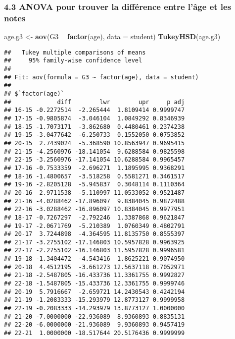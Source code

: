 \documentclass[
]{article}
\newenvironment{Shaded}{\begin{snugshade}}{\end{snugshade}}
\newcommand{\DataTypeTok}[1]{\textcolor[rgb]{0.13,0.29,0.53}{#1}}
\newcommand{\KeywordTok}[1]{\textcolor[rgb]{0.13,0.29,0.53}{\textbf{#1}}}
\newcommand{\NormalTok}[1]{#1}
\newcommand{\OperatorTok}[1]{\textcolor[rgb]{0.81,0.36,0.00}{\textbf{#1}}}
\newcommand{\StringTok}[1]{\textcolor[rgb]{0.31,0.60,0.02}{#1}}
\begin{document}
\hypertarget{anova-pour-trouver-la-diffuxe9rence-entre-luxe2ge-et-les-notes}{%
\subsubsection{4.3 ANOVA pour trouver la différence entre l'âge et les
notes}\label{anova-pour-trouver-la-diffuxe9rence-entre-luxe2ge-et-les-notes}}

\begin{Shaded}
\begin{Highlighting}[]
\NormalTok{age.g3 <-}\StringTok{ }\KeywordTok{aov}\NormalTok{(G3 }\OperatorTok{~}\StringTok{ }\KeywordTok{factor}\NormalTok{(age), }\DataTypeTok{data =}\NormalTok{ student)}
\KeywordTok{TukeyHSD}\NormalTok{(age.g3)}
\end{Highlighting}
\end{Shaded}

\begin{verbatim}
##   Tukey multiple comparisons of means
##     95% family-wise confidence level
## 
## Fit: aov(formula = G3 ~ factor(age), data = student)
## 
## $`factor(age)`
##             diff        lwr        upr     p adj
## 16-15 -0.2272514  -2.265444  1.8109414 0.9999747
## 17-15 -0.9805874  -3.046104  1.0849292 0.8346939
## 18-15 -1.7073171  -3.862680  0.4480461 0.2374238
## 19-15 -3.0477642  -6.250733  0.1552050 0.0753852
## 20-15  2.7439024  -5.368590 10.8563947 0.9695415
## 21-15 -4.2560976 -18.141054  9.6288584 0.9825598
## 22-15 -3.2560976 -17.141054 10.6288584 0.9965457
## 17-16 -0.7533359  -2.696271  1.1895995 0.9368291
## 18-16 -1.4800657  -3.518258  0.5581271 0.3461517
## 19-16 -2.8205128  -5.945837  0.3048114 0.1110364
## 20-16  2.9711538  -5.110997 11.0533052 0.9521487
## 21-16 -4.0288462 -17.896097  9.8384045 0.9872488
## 22-16 -3.0288462 -16.896097 10.8384045 0.9977951
## 18-17 -0.7267297  -2.792246  1.3387868 0.9621847
## 19-17 -2.0671769  -5.210389  1.0760349 0.4802791
## 20-17  3.7244898  -4.364595 11.8135750 0.8555397
## 21-17 -3.2755102 -17.146803 10.5957828 0.9963925
## 22-17 -2.2755102 -16.146803 11.5957828 0.9996581
## 19-18 -1.3404472  -4.543416  1.8625221 0.9074950
## 20-18  4.4512195  -3.661273 12.5637118 0.7052971
## 21-18 -2.5487805 -16.433736 11.3361755 0.9992827
## 22-18 -1.5487805 -15.433736 12.3361755 0.9999746
## 20-19  5.7916667  -2.659721 14.2430543 0.4242194
## 21-19 -1.2083333 -15.293979 12.8773127 0.9999958
## 22-19 -0.2083333 -14.293979 13.8773127 1.0000000
## 21-20 -7.0000000 -22.936089  8.9360893 0.8835131
## 22-20 -6.0000000 -21.936089  9.9360893 0.9457419
## 22-21  1.0000000 -18.517644 20.5176436 0.9999999
\end{verbatim}
\end{document}
